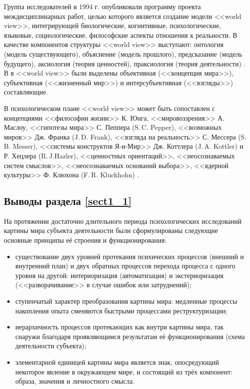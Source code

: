Группа исследователей \cite{Aerts1994} в 1994 г. опубликовали программу проекта междисциплинарных работ, целью которого является создание модели <<world view>>, интегрирующей биологические, когнитивные, психологические, языковые, социологические, философские аспекты отношения к реальности. В качестве компонентов структуры <<world view>> выступают: онтология (модель существующего), объяснение (модель прошлого), предсказание (модель будущего), аксиология (теория ценностей), праксиология (теория деятельности) \cite{Aerts1994}. В \cite{Vidal2012} в <<world view>> были выделены объективная (<<концепция мира>>), субъективная (<<жизненный мир>>) и интерсубъективная (<<взгляды>>) составляющие. 

В психологическом плане <<world view>> может быть сопоставлен с концепциями <<философии жизни>> К. Юнга, <<мировоззрения>> А. Маслоу, <<гипотезы мира>> С. Пеппера (S.\,C. Pepper), <<возможных миров>> Дж. Франка (J.\,D. Frank), <<взгляда на реальность>> С. Мессера (S.\,B. Messer), <<системы конструктов Я-и-Мир>> Дж. Коттлера (J.\,A. Kottler) и Р. Хецлера (R.\,J.Hazler), <<ценностных ориентаций>>, <<неосознаваемых систем смыслов>>, <<неосознаваемых оснований выбора>>, <<ядерной культуры>> Ф. Клюхона (F.\,R. Kluckhohn) \cite{Koltko-Rivera2004}. 

\subsection{Выводы раздела \ref{sect1_1}}

На протяжении достаточно длительного периода психологических исследований картины мира субъекта деятельности были сформулированы следующие основные принципы её строения и функционирования:
\begin{itemize}
	\item существование двух уровней протекания психических процессов (внешний и внутренний план) и двух обратных процессов перехода процесса с одного уровня на другой: интериоризация (автоматизация) и экстериоризация (<<разворачивание>> в случае ошибок или затруднений);
	\item ступенчатый характер преобразования картины мира: медленные процессы накопления опыта сменяются быстрыми процессами реструктуризации;
	\item иерархичность процессов протекающих как внутри картины мира, так снаружи благодаря проявляющимся результатам её функционирования (схема деятельности субъекта);
	\item элементарной единицей картины мира является знак, опосредующий некоторое явление в окружающем мире, и состоящий из трёх компонент: образа, значения и личностного смысла.
\end{itemize}

